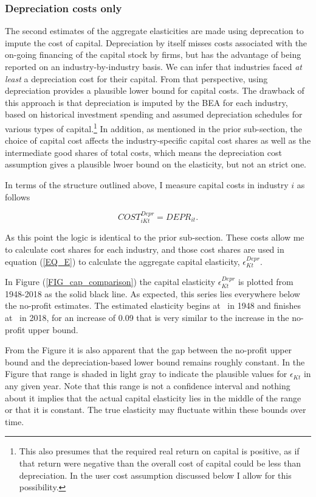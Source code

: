 \documentclass[11pt]{article}
\begin{document}
\subsubsection{Depreciation costs only}
The second estimates of the aggregate elasticities are made using deprecation to impute the cost of capital. Depreciation by itself misses costs associated with the on-going financing of the capital stock by firms, but has the advantage of being reported on an industry-by-industry basis. We can infer that industries faced \textit{at least} a depreciation cost for their capital. From that perspective, using depreciation provides a plausible lower bound for capital costs. The drawback of this approach is that depreciation is imputed by the BEA for each industry, based on historical investment spending and assumed depreciation schedules for various types of capital.\footnote{This also presumes that the required real return on capital is positive, as if that return were negative than the overall cost of capital could be less than depreciation. In the user cost assumption discussed below I allow for this possibility.} In addition, as mentioned in the prior sub-section, the choice of capital cost affects the industry-specific capital cost shares as well as the intermediate good shares of total costs, which means the depreciation cost assumption gives a plausible lwoer bound on the elasticity, but not an strict one.

In terms of the structure outlined above, I measure capital costs in industry $i$ as follows

\begin{equation}
	COST^{Depr}_{iKt} = DEPR_{it}. 
\end{equation}

As this point the logic is identical to the prior sub-section. These costs allow me to calculate cost shares for each industry, and those cost shares are used in equation (\ref{EQ_E}) to calculate the aggregate capital elasticity, $\epsilon_{Kt}^{Depr}$.

In Figure (\ref{FIG_cap_comparison}) the capital elasticity $\epsilon_{Kt}^{Depr}$ is plotted from 1948-2018 as the solid black line. As expected, this series lies everywhere below the no-profit estimates. The estimated elasticity begins at \basefirstdepr \ in 1948 and finishes at \baselastdepr \  in 2018, for an increase of 0.09 that is very similar to the increase in the no-profit upper bound. 

From the Figure it is also apparent that the gap between the no-profit upper bound and the depreciation-based lower bound remains roughly constant. In the Figure that range is shaded in light gray to indicate the plausible values for $\epsilon_{Kt}$ in any given year. Note that this range is not a confidence interval and nothing about it implies that the actual capital elasticity lies in the middle of the range or that it is constant. The true elasticity may fluctuate within these bounds over time.
\end{document}
